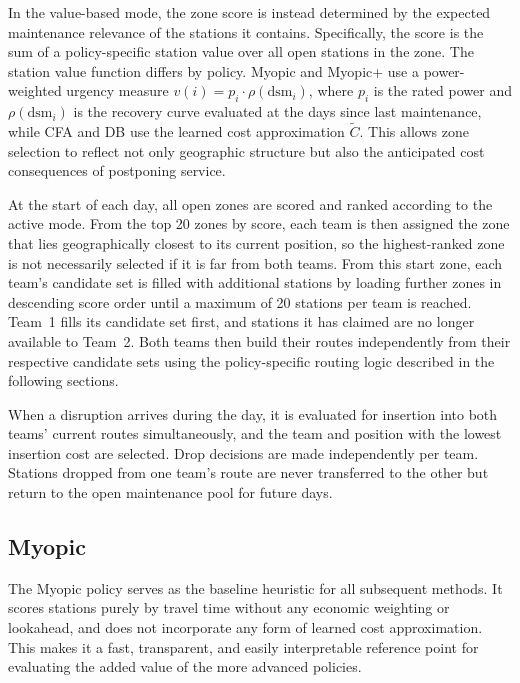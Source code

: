 \documentclass[12pt,oneside]{article}
\begin{document}
In the value-based mode, the zone score is instead determined by the expected maintenance relevance of the stations it contains. Specifically, the score is the sum of a policy-specific station value over all open stations in the zone. The station value function differs by policy. Myopic and Myopic+ use a power-weighted urgency measure $v(i) = p_i \cdot \rho(\mathrm{dsm}_i)$, where $p_i$ is the rated power and $\rho(\mathrm{dsm}_i)$ is the recovery curve evaluated at the days since last maintenance, while CFA and DB use the learned cost approximation $\tilde{C}$. This allows zone selection to reflect not only geographic structure but also the anticipated cost consequences of postponing service.

At the start of each day, all open zones are scored and ranked according to the active mode. From the top 20 zones by score, each team is then assigned the zone that lies geographically closest to its current position, so the highest-ranked zone is not necessarily selected if it is far from both teams. From this start zone, each team's candidate set is filled with additional stations by loading further zones in descending score order until a maximum of 20 stations per team is reached. Team~1 fills its candidate set first, and stations it has claimed are no longer available to Team~2. Both teams then build their routes independently from their respective candidate sets using the policy-specific routing logic described in the following sections.

When a disruption arrives during the day, it is evaluated for insertion into both teams' current routes simultaneously, and the team and position with the lowest insertion cost are selected. Drop decisions are made independently per team. Stations dropped from one team's route are never transferred to the other but return to the open maintenance pool for future days.

\subsection{Myopic}\label{subsec:myopic}
The Myopic policy serves as the baseline heuristic for all subsequent methods. It scores stations purely by travel time without any economic weighting or lookahead, and does not incorporate any form of learned cost approximation. This makes it a fast, transparent, and easily interpretable reference point for evaluating the added value of the more advanced policies.
\end{document}
